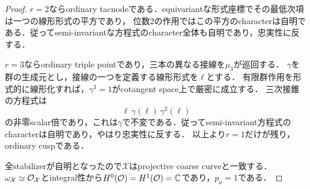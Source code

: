 \documentclass[11pt,a4paper]{ltjsarticle}
\begin{document}
\begin{proof}
$r=2$ならordinary tacnodeである．equivariantな形式座標でその最低次項は一つの線形形式の平方であり，
位数2の作用ではこの平方のcharacterは自明である．従ってsemi-invariantな方程式のcharacter全体も自明であり，忠実性に反する．

$r=3$ならordinary triple pointであり，三本の異なる接線を$\mu_3$が巡回する．
$\gamma$を群の生成元とし，接線の一つを定義する線形形式を$\ell$とする．
有限群作用を形式的に線形化すれば，$\gamma^3=1$がcotangent space上で厳密に成立する．
三次接錐の方程式は
\[
 \ell\,\gamma(\ell)\,\gamma^2(\ell)
\]
の非零scalar倍であり，これは$\gamma$で不変である．従ってsemi-invariant方程式のcharacterは自明であり，やはり忠実性に反する．
以上より$r=1$だけが残り，ordinary cuspである．

全stabilizerが自明となったので$\mathcal X$はprojective coarse curveと一致する．
$\omega_{\mathcal X}\simeq\mathcal O_{\mathcal X}$とintegral性から$H^0(\mathcal O)=H^1(\mathcal O)=\mathbb C$であり，$p_a=1$である．
\end{proof}
\end{document}
